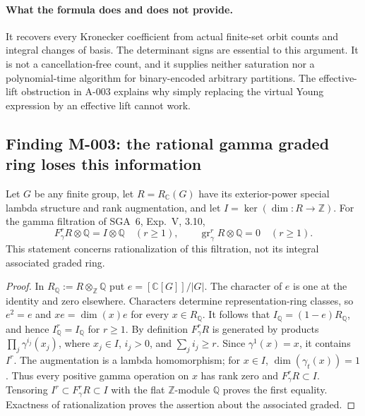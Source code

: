 \paragraph{What the formula does and does not provide.}
It recovers every Kronecker coefficient from actual finite-set orbit
counts and integral changes of basis.  The determinant signs are
essential to this argument.  It is not a cancellation-free count,
and it supplies neither saturation nor a polynomial-time algorithm
for binary-encoded arbitrary partitions.  The effective-lift
obstruction in A-003 explains why simply replacing the virtual
Young expression by an effective lift cannot work.

\subsection*{Finding M-003: the rational gamma graded ring loses this information}
Let \(G\) be any finite group, let \(R=R_{\mathbb C}(G)\) have its
exterior-power special lambda structure and rank augmentation, and
let \(I=\ker(\dim:R\to\mathbb Z)\).
For the gamma filtration of SGA~6, Exp.~V, 3.10,
\begin{equation}\label{eq:M003}
 F_\gamma^rR\otimes\mathbb Q=I\otimes\mathbb Q
 \quad(r\geq1),\qquad
 \operatorname{gr}_\gamma^rR\otimes\mathbb Q=0
 \quad(r\geq1).
\end{equation}
This statement concerns rationalization of this filtration, not its
integral associated graded ring.

\begin{proof}
In \(R_{\mathbb Q}:=R\otimes_{\mathbb Z}\mathbb Q\) put
\(e=[\mathbb C[G]]/|G|\).
The character of \(e\) is one at the identity and zero elsewhere.
Characters determine representation-ring classes, so \(e^2=e\) and
\(xe=\dim(x)e\) for every \(x\in R_{\mathbb Q}\).
It follows that \(I_{\mathbb Q}=(1-e)R_{\mathbb Q}\), and hence
\(I_{\mathbb Q}^r=I_{\mathbb Q}\) for \(r\geq1\).
By definition \(F_\gamma^rR\) is generated by products
\(\prod_j\gamma^{i_j}(x_j)\), where
\(x_j\in I\), \(i_j>0\), and \(\sum_j i_j\geq r\).
Since \(\gamma^1(x)=x\), it contains \(I^r\).
The augmentation is a lambda homomorphism; for \(x\in I\),
\(\dim(\gamma_t(x))=1\).  Thus every positive gamma operation on
\(x\) has rank zero and \(F_\gamma^rR\subset I\).
Tensoring \(I^r\subset F_\gamma^rR\subset I\) with the flat
\(\mathbb Z\)-module \(\mathbb Q\) proves the first equality.
Exactness of rationalization proves the assertion about the
associated graded.
\end{proof}

